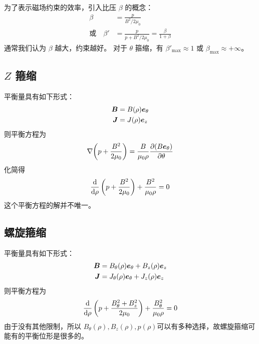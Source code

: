 为了表示磁场约束的效率，引入比压 $\beta$ 的概念：
\begin{subequations}\begin{align}
\beta &= \frac{p}{B^2 / 2 \mu_0} \\
\text{或} \quad \beta' &= \frac{p}{p + B^2 / 2 \mu_0}
= \frac{\beta}{1 + \beta}
\end{align}\end{subequations}
通常我们认为 $\beta$ 越大，约束越好。
对于 $\theta$ 箍缩，有 $\beta'_{\max} \approx 1$ 或 $\beta_{\max} \approx + \infty$。

\subsection{\texorpdfstring{$Z$}{Z} 箍缩}

平衡量具有如下形式：
\begin{subequations}\begin{align}
\bm{B} &= B(\rho) \bm{e}_\theta \\
\bm{J} &= J(\rho) \bm{e}_z
\end{align}\end{subequations}
则平衡方程为
\begin{equation}
\nabla {\left( p + \frac{B^2}{2 \mu_0} \right)}
= \frac{B}{\mu_0 \rho} \frac{\partial {(B \bm{e}_\theta)}}{\partial {\theta}}
\end{equation}
化简得
\begin{equation}
\frac{\mathop{}\!\mathrm{d} {}}{\mathop{}\!\mathrm{d} {\rho}} \left( p + \frac{B^2}{2 \mu_0} \right)
+ \frac{B^2}{\mu_0 \rho} = 0
\end{equation}
这个平衡方程的解并不唯一。

\subsection{螺旋箍缩}

平衡量具有如下形式：
\begin{subequations}\begin{align}
\bm{B} &= B_\theta(\rho) \bm{e}_\theta + B_z(\rho) \bm{e}_z \\
\bm{J} &= J_\theta(\rho) \bm{e}_\theta + J_z(\rho) \bm{e}_z
\end{align}\end{subequations}
则平衡方程为
\begin{equation}
\frac{\mathop{}\!\mathrm{d} {}}{\mathop{}\!\mathrm{d} {\rho}} \left( p + \frac{B_\theta^2 + B_z^2}{2 \mu_0} \right)
+ \frac{B_\theta^2}{\mu_0 \rho} = 0
\end{equation}
由于没有其他限制，所以 $B_\theta(\rho), B_z(\rho), p(\rho)$可以有多种选择，故螺旋箍缩可能有的平衡位形是很多的。

